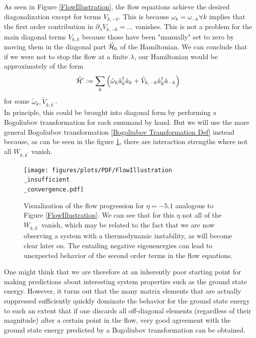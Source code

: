 As seen in Figure \ref{FlowIllustration}, the flow equations achieve the desired diagonalization except for terms $V_{k,-k}$. This is because $\omega_k=\omega_{-k}\forall k$ implies that the first order contribution in $\partial_\lambda V_{k,-k} =...$ vanishes. This is not a problem for the main diagonal terms $V_{k,k}$ because those have been "manually" set to zero by moving them in the diagonal part $\hat{\mathcal{H}}_0$ of the Hamiltonian. We can conclude that if we were not to stop the flow at a finite $\lambda$, our Hamiltonian would be approximately of the form 
\begin{equation}
\hat{\mathcal{H}}^\prime \vcentcolon= \sum\limits_{k}\left(\tilde\omega_k \hat a^\dagger_k\hat a_k + \tilde V_{k,-k}\hat a^\dagger_k\hat a_{-k}\right)
\end{equation}
for some $\tilde\omega_k,\tilde V_{k,k^\prime}$.\\
In principle, this could be brought into diagonal form by performing a Bogoliubov transformation for each summand by hand. But we will use the more general Bogoliubov transformation \ref{Bogoliubov Transformation Def} instead because, as can be seen in the figure \ref{FlowIllustrationInsufficient}, there are interaction strengths where not all $W_{k,k^\prime}$ vanish.
\begin{figure}[H]
    \centering
    \texttt{[image: figures/plots/PDF/FlowIllustration\\\_insufficient\\\_convergence.pdf]}
    \caption[Flow Visualization for $\eta=-5.1$]{Visualization of the flow progression for $\eta=-5.1$ analogous to Figure \ref{FlowIllustration}. We can see that for this $\eta$ not all of the $W_{k,k^\prime}$ vanish, which may be related to the fact that we are now observing a system with a thermodynamic instability, as will become clear later on. The entailing negative eigenenergies can lead to unexpected behavior of the second order terms in the flow equations.}
    \label{FlowIllustrationInsufficient}
\end{figure}
One might think that we are therefore at an inherently poor starting point for making predictions about interesting system properties such as the ground state energy. However, it turns out that the many matrix elements that are actually suppressed sufficiently quickly dominate the behavior for the ground state energy to such an extent that if one discards all off-diagonal elements (regardless of their magnitude) after a certain point in the flow, very good agreement with the ground state energy predicted by a Bogoliubov transformation can be obtained.

